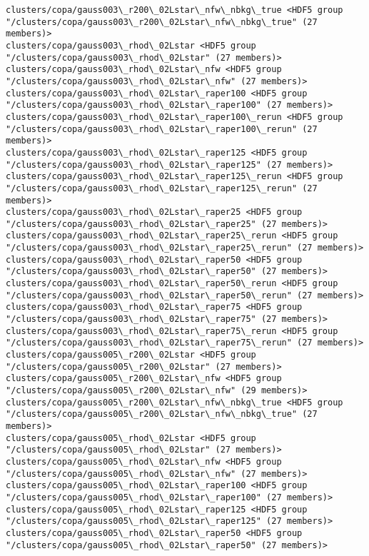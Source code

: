 \documentclass[11pt]{article}
\begin{document}
\begin{Verbatim}[commandchars=\\\{\}]
clusters/copa/gauss003\_r200\_02Lstar\_nfw\_nbkg\_true <HDF5 group "/clusters/copa/gauss003\_r200\_02Lstar\_nfw\_nbkg\_true" (27 members)>
clusters/copa/gauss003\_rhod\_02Lstar <HDF5 group "/clusters/copa/gauss003\_rhod\_02Lstar" (27 members)>
clusters/copa/gauss003\_rhod\_02Lstar\_nfw <HDF5 group "/clusters/copa/gauss003\_rhod\_02Lstar\_nfw" (27 members)>
clusters/copa/gauss003\_rhod\_02Lstar\_raper100 <HDF5 group "/clusters/copa/gauss003\_rhod\_02Lstar\_raper100" (27 members)>
clusters/copa/gauss003\_rhod\_02Lstar\_raper100\_rerun <HDF5 group "/clusters/copa/gauss003\_rhod\_02Lstar\_raper100\_rerun" (27 members)>
clusters/copa/gauss003\_rhod\_02Lstar\_raper125 <HDF5 group "/clusters/copa/gauss003\_rhod\_02Lstar\_raper125" (27 members)>
clusters/copa/gauss003\_rhod\_02Lstar\_raper125\_rerun <HDF5 group "/clusters/copa/gauss003\_rhod\_02Lstar\_raper125\_rerun" (27 members)>
clusters/copa/gauss003\_rhod\_02Lstar\_raper25 <HDF5 group "/clusters/copa/gauss003\_rhod\_02Lstar\_raper25" (27 members)>
clusters/copa/gauss003\_rhod\_02Lstar\_raper25\_rerun <HDF5 group "/clusters/copa/gauss003\_rhod\_02Lstar\_raper25\_rerun" (27 members)>
clusters/copa/gauss003\_rhod\_02Lstar\_raper50 <HDF5 group "/clusters/copa/gauss003\_rhod\_02Lstar\_raper50" (27 members)>
clusters/copa/gauss003\_rhod\_02Lstar\_raper50\_rerun <HDF5 group "/clusters/copa/gauss003\_rhod\_02Lstar\_raper50\_rerun" (27 members)>
clusters/copa/gauss003\_rhod\_02Lstar\_raper75 <HDF5 group "/clusters/copa/gauss003\_rhod\_02Lstar\_raper75" (27 members)>
clusters/copa/gauss003\_rhod\_02Lstar\_raper75\_rerun <HDF5 group "/clusters/copa/gauss003\_rhod\_02Lstar\_raper75\_rerun" (27 members)>
clusters/copa/gauss005\_r200\_02Lstar <HDF5 group "/clusters/copa/gauss005\_r200\_02Lstar" (27 members)>
clusters/copa/gauss005\_r200\_02Lstar\_nfw <HDF5 group "/clusters/copa/gauss005\_r200\_02Lstar\_nfw" (29 members)>
clusters/copa/gauss005\_r200\_02Lstar\_nfw\_nbkg\_true <HDF5 group "/clusters/copa/gauss005\_r200\_02Lstar\_nfw\_nbkg\_true" (27 members)>
clusters/copa/gauss005\_rhod\_02Lstar <HDF5 group "/clusters/copa/gauss005\_rhod\_02Lstar" (27 members)>
clusters/copa/gauss005\_rhod\_02Lstar\_nfw <HDF5 group "/clusters/copa/gauss005\_rhod\_02Lstar\_nfw" (27 members)>
clusters/copa/gauss005\_rhod\_02Lstar\_raper100 <HDF5 group "/clusters/copa/gauss005\_rhod\_02Lstar\_raper100" (27 members)>
clusters/copa/gauss005\_rhod\_02Lstar\_raper125 <HDF5 group "/clusters/copa/gauss005\_rhod\_02Lstar\_raper125" (27 members)>
clusters/copa/gauss005\_rhod\_02Lstar\_raper50 <HDF5 group "/clusters/copa/gauss005\_rhod\_02Lstar\_raper50" (27 members)>

\end{Verbatim}
\end{document}
